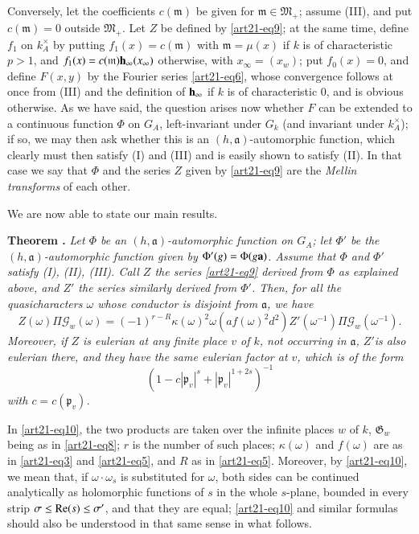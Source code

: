 Conversely, let the coefficients $c(\mathfrak{m})$ be given for $\mathfrak{m}\in \mathfrak{M}_{+}$; assume (III), and put $c(\mathfrak{m})=0$ outside $\mathfrak{M}_{+}$. Let $Z$ be defined by \eqref{art21-eq9}; at the same time, define $f_{1}$ on $k^{\times}_{A}$ by putting $f_{1}(x)=c(\mathfrak{m})$ with $\mathfrak{m}=\mu(x)$ if $k$ is of characteristic $p>1$, and $f_{1}(x)=c(\mathfrak{m})\mathbf{h}_{\infty}(x_{\infty})$ otherwise, with $x_{\infty}=(x_{w})$; put $f_{0}(x)=0$, and define $F(x,y)$ by the Fourier series \eqref{art21-eq6}, whose convergence follows at once from (III) and the definition of $\mathbf{h}_{\infty}$ if $k$ is of characteristic $0$, and is obvious otherwise. As we have said, the question arises now whether $F$ can be extended to a continuous function $\Phi$ on $G_{A}$, left-invariant under $G_{k}$ (and invariant under $k^{\times}_{A}$); if so, we may then ask whether this is an $(h,\mathfrak{a})$-automorphic function, which clearly must then satisfy (I) and (III) and is easily shown to satisfy (II). In that case we say that $\Phi$ and the series $Z$ given by \eqref{art21-eq9} are the {\em Mellin transforms} of each other. 

We are now able to state our main results.

\medskip
\noindent
{\bf Theorem .\label{art21-thm1}}
{\em Let $\Phi$ be an $(h,\mathfrak{a})$-automorphic function on $G_{A}$; let $\Phi'$ be the $(h,\mathfrak{a})$-automorphic function given by $\Phi'(g)=\Phi(g\mathbf{a})$. Assume that $\Phi$ and $\Phi'$ satisfy {\rm (I), (II), (III)}. Call $Z$ the series \eqref{art21-eq9} derived from $\Phi$ as explained above, and $Z'$ the series similarly derived from $\Phi'$. Then, for all the quasicharacters $\omega$ whose conductor is disjoint from $\mathfrak{a}$, we have}
\begin{equation*}
Z(\omega)\Pi \mathscr{G}_{w}(\omega)=(-1)^{r-R}\kappa(\omega)^{2}\omega(af(\omega)^{2}d^{2})Z'(\omega^{-1})\Pi \mathscr{G}_{w}(\omega^{-1}).\tag{10}\label{art21-eq10}
\end{equation*}
{\em Moreover, if $Z$ is eulerian at any finite place $v$ of $k$, not occurring in $\mathfrak{a}$, $Z'$\pageoriginale is also eulerian there, and they have the same eulerian factor at $v$, which is of the form}
\begin{equation*}
(1-c|\mathfrak{p}_{v}|^{s}+|\mathfrak{p}_{v}|^{1+2s})^{-1}\tag{11}\label{art21-eq11}
\end{equation*}
{\em with $c=c(\mathfrak{p}_{v})$.}
\smallskip

In \eqref{art21-eq10}, the two products are taken over the infinite places $w$ of $k$, $\mathfrak{G}_{w}$ being as in \eqref{art21-eq8}; $r$ is the number of such places; $\kappa(\omega)$ and $f(\omega)$ are as in \eqref{art21-eq3} and \eqref{art21-eq5}, and $R$ as in \eqref{art21-eq5}. Moreover, by \eqref{art21-eq10}, we mean that, if $\omega\cdot \omega_{s}$ is substituted for $\omega$, both sides can be continued analytically as holomorphic functions of $s$ in the whole $s$-plane, bounded in every strip $\sigma \leq \operatorname{\mathrm{Re}}(s)\leq \sigma'$, and that they are equal; \eqref{art21-eq10} and similar formulas should also be understood in that same sense in what follows.

